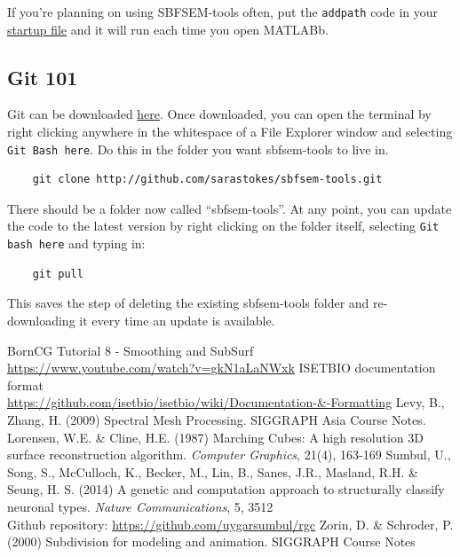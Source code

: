 \documentclass[12pt]{exam}
\begin{document}
	If you're planning on using SBFSEM-tools often, put the \texttt{addpath} code in your 
	\href{https://www.mathworks.com/help/matlab/ref/startup.html}{startup file} and it will run each time you open MATLABb. 
	\subsection{Git 101}
	Git can be downloaded \href{https://git-scm.com/}{here}. Once downloaded, you can open the terminal by right clicking anywhere in the whitespace of a File Explorer window and selecting \texttt{Git Bash here}. Do this in the folder you want sbfsem-tools to live in. 
	\begin{lstlisting}
	git clone http://github.com/sarastokes/sbfsem-tools.git\end{lstlisting}
	There should be a folder now called ``sbfsem-tools''. At any point, you can update the code to the latest version by right clicking on the folder itself, selecting \texttt{Git bash here} and typing in:
	\begin{lstlisting}
	git pull\end{lstlisting}
	This saves the step of deleting the existing sbfsem-tools folder and re-downloading it every time an update is available.
	\begin{thebibliography}{[20]}
			BornCG Tutorial 8 - Smoothing and SubSurf\\
			\url{https://www.youtube.com/watch?v=gkN1aLaNWxk}
			ISETBIO documentation format\\
			\url{https://github.com/isetbio/isetbio/wiki/Documentation-&-Formatting}
			Levy, B., Zhang, H. (2009) Spectral Mesh Processing. SIGGRAPH Asia Course Notes.
			Lorensen, W.E. \& Cline, H.E. (1987) Marching Cubes: A high resolution 3D surface reconstruction algorithm. \textit{Computer Graphics}, 21(4), 163-169
			Sumbul, U., Song, S., McCulloch, K., Becker, M., Lin, B., Sanes, J.R., Masland, R.H. \& Seung, H. S. (2014) A genetic and computation approach to structurally classify neuronal types. \textit{Nature Communications}, 5, 3512\\
			Github repository: \url{https://github.com/uygarsumbul/rgc}
			Zorin, D. \& Schroder, P. (2000) Subdivision for modeling and animation. SIGGRAPH Course Notes
	\end{thebibliography}
\end{document}
